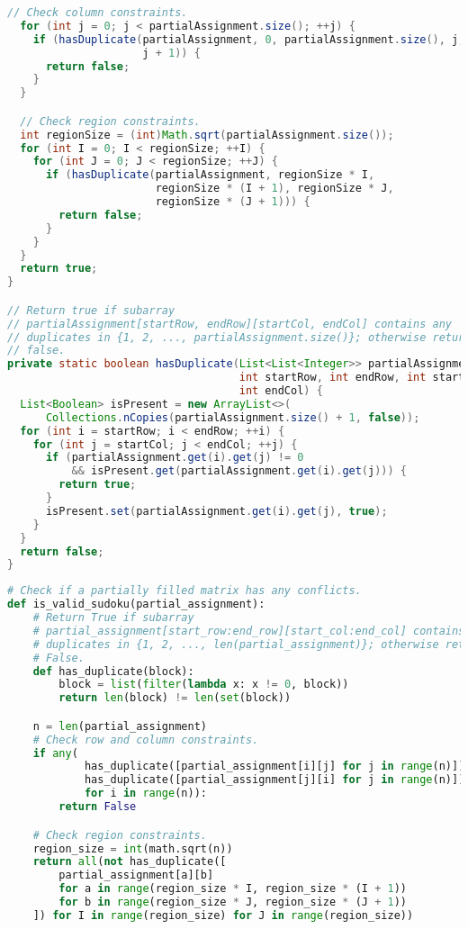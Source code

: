 \documentclass[10pt,openany,twoside,letterpaper,extrafontsizes]{memoir}
\newif\ifPython
\begin{document}
\begin{Spacing}{\arraysSpacing}
\begin{lstlisting}[language=Java]
  // Check column constraints.
  for (int j = 0; j < partialAssignment.size(); ++j) {
    if (hasDuplicate(partialAssignment, 0, partialAssignment.size(), j,
                     j + 1)) {
      return false;
    }
  }

  // Check region constraints.
  int regionSize = (int)Math.sqrt(partialAssignment.size());
  for (int I = 0; I < regionSize; ++I) {
    for (int J = 0; J < regionSize; ++J) {
      if (hasDuplicate(partialAssignment, regionSize * I,
                       regionSize * (I + 1), regionSize * J,
                       regionSize * (J + 1))) {
        return false;
      }
    }
  }
  return true;
}

// Return true if subarray
// partialAssignment[startRow, endRow][startCol, endCol] contains any
// duplicates in {1, 2, ..., partialAssignment.size()}; otherwise return
// false.
private static boolean hasDuplicate(List<List<Integer>> partialAssignment,
                                    int startRow, int endRow, int startCol,
                                    int endCol) {
  List<Boolean> isPresent = new ArrayList<>(
      Collections.nCopies(partialAssignment.size() + 1, false));
  for (int i = startRow; i < endRow; ++i) {
    for (int j = startCol; j < endCol; ++j) {
      if (partialAssignment.get(i).get(j) != 0
          && isPresent.get(partialAssignment.get(i).get(j))) {
        return true;
      }
      isPresent.set(partialAssignment.get(i).get(j), true);
    }
  }
  return false;
}
\end{lstlisting}
\fi%
\ifPython
\begin{lstlisting}[language=Python]
# Check if a partially filled matrix has any conflicts.
def is_valid_sudoku(partial_assignment):
    # Return True if subarray
    # partial_assignment[start_row:end_row][start_col:end_col] contains any
    # duplicates in {1, 2, ..., len(partial_assignment)}; otherwise return
    # False.
    def has_duplicate(block):
        block = list(filter(lambda x: x != 0, block))
        return len(block) != len(set(block))

    n = len(partial_assignment)
    # Check row and column constraints.
    if any(
            has_duplicate([partial_assignment[i][j] for j in range(n)]) or
            has_duplicate([partial_assignment[j][i] for j in range(n)])
            for i in range(n)):
        return False

    # Check region constraints.
    region_size = int(math.sqrt(n))
    return all(not has_duplicate([
        partial_assignment[a][b]
        for a in range(region_size * I, region_size * (I + 1))
        for b in range(region_size * J, region_size * (J + 1))
    ]) for I in range(region_size) for J in range(region_size))



\end{lstlisting}
\end{Spacing}
\end{document}
